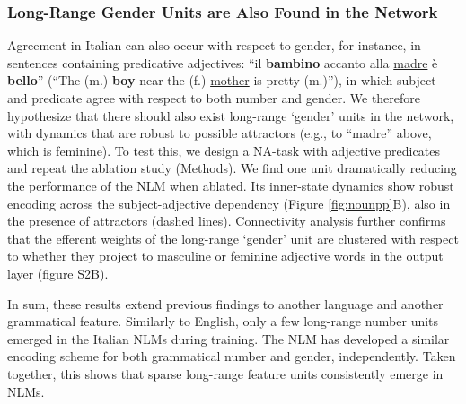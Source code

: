 \subsubsection{Long-Range Gender Units are Also Found in the Network }
Agreement in Italian can also occur with respect to gender, for instance, in sentences containing predicative adjectives: ``il \textbf{bambino} accanto alla \underline{madre} \`{e} \textbf{bello}'' (``The (m.) \textbf{boy} near the (f.) \underline{mother} is pretty (m.)''), in which subject and predicate agree with respect to both number and gender. We therefore hypothesize that there should also exist long-range `gender' units in the network, with dynamics that are robust to possible attractors (e.g., to ``madre'' above, which is feminine). 
To test this, we design a NA-task with adjective predicates and repeat the ablation study (Methods). 
We find one unit dramatically reducing the performance of the NLM when ablated. Its inner-state dynamics show robust encoding across the subject-adjective dependency (Figure \ref{fig:nounpp}B), also in the presence of attractors (dashed lines). Connectivity analysis further confirms that the efferent weights of the long-range `gender' unit are clustered with respect to whether they project to masculine or feminine adjective words in the output layer (figure S2B).



\vspace{10pt}
In sum, these results extend previous findings to another language and another grammatical feature. Similarly to English, only a few long-range number units emerged in the Italian NLMs during training. The NLM has developed a similar encoding scheme for both grammatical number and gender, independently. Taken together, this shows that sparse long-range feature units consistently emerge in NLMs.




